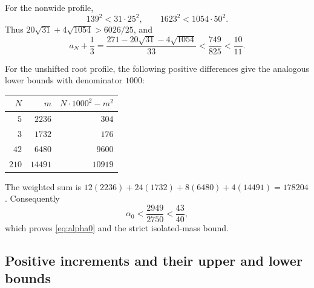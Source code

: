 \documentclass[11pt]{article}
\theoremstyle{definition}
\theoremstyle{remark}
\begin{document}
For the nonwide profile,
\[
 139^2<31\cdot25^2,\qquad 1623^2<1054\cdot50^2.
\]
Thus $20\sqrt{31}+4\sqrt{1054}>6026/25$, and
\[
 a_N+\frac13
   =\frac{271-20\sqrt{31}-4\sqrt{1054}}{33}
   <\frac{749}{825}<\frac{10}{11}.
\]

For the unshifted root profile, the following positive differences give
the analogous lower bounds with denominator $1000$:
\begin{center}
\begin{tabular}{rrr}
\toprule
$N$ & $m$ & $N\cdot1000^2-m^2$\\
\midrule
$5$ & $2236$ & $304$\\
$3$ & $1732$ & $176$\\
$42$ & $6480$ & $9600$\\
$210$ & $14491$ & $10919$\\
\bottomrule
\end{tabular}
\end{center}
The weighted sum is
$12(2236)+24(1732)+8(6480)+4(14491)=178204$.
Consequently
\[
 \alpha_0<\frac{2949}{2750}<\frac{43}{40},
\]
which proves \eqref{eq:alpha0} and the strict isolated-mass bound.

\subsection{Positive increments and their upper and lower bounds}
\end{document}
